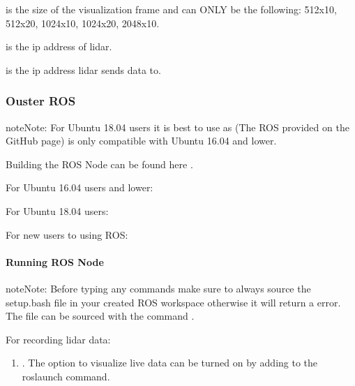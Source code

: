 \documentclass[letterpaper,10pt,english]{sphinxmanual}
\begin{document}
 is the size of the visualization frame and can ONLY be the following: 512x10, 512x20, 1024x10, 1024x20, 2048x10.

 is the ip address of lidar.

 is the ip address lidar sends data to.


\subsubsection{Ouster ROS}
\label{\detokenize{Ouster lidar:ouster-ros}}
\begin{sphinxadmonition}{note}{Note:}
For Ubuntu 18.04 users it is best to use  as  (The ROS provided on the GitHub page) is only compatible with Ubuntu 16.04 and lower.
\end{sphinxadmonition}

Building the ROS Node can be found here .

For Ubuntu 16.04 users and lower: 

For Ubuntu 18.04 users: 

For new users to using ROS: 


\paragraph{Running ROS Node}
\label{\detokenize{Ouster lidar:running-ros-node}}
\begin{sphinxadmonition}{note}{Note:}
Before typing any commands make sure to always source the setup.bash file in your created ROS workspace otherwise it will return a error. The file can be sourced with the command .
\end{sphinxadmonition}

For recording lidar data:
\begin{enumerate}
\def\theenumi{\arabic{enumi}}
\def\labelenumi{\theenumi .}
\makeatletter\def\p@enumii{\p@enumi \theenumi .}\makeatother
\item {} 
. The option to visualize live data can be turned on by adding  to the roslaunch command.

\end{enumerate}
\end{document}
